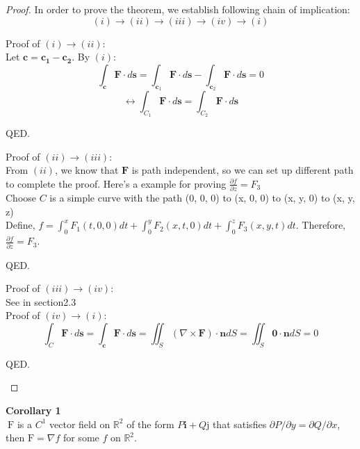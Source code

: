 \documentclass[11pt]{article}
\begin{document}
\begin{proof}
    In order to prove the theorem, we establish following chain of implication:
    \[(i) \rightarrow (ii) \rightarrow (iii) \rightarrow (iv) \rightarrow (i)\]


    Proof of $(i) \rightarrow (ii)$:\\
    Let $\mathbf{c}=\mathbf{c_1}-\mathbf{c_2}$. By $(i)$:
    \[\int_{\mathbf{c}} \mathbf{F} \cdot d \mathbf{s}=\int_{\mathbf{c}_{1}} \mathbf{F} \cdot d \mathbf{s}-\int_{\mathbf{c}_{2}} \mathbf{F} \cdot d \mathbf{s}=0\]
    \[\leftrightarrow \int_{C_{1}} \mathbf{F} \cdot d \mathbf{s}=\int_{C_{2}} \mathbf{F} \cdot d \mathbf{s}\]
    \begin{flushright}QED.\end{flushright}
    

    Proof of $(ii) \rightarrow (iii)$:\\
    From $(ii)$, we know that $\mathbf{F}$ is path independent, so we can set up different path to complete the proof. Here's a example for proving $\frac{\partial f}{\partial z} = F_3$\\
    Choose $C$ is a simple curve with the path (0, 0, 0) to (x, 0, 0) to (x, y, 0) to (x, y, z)\\
    Define, $f = \int_{0}^{x} F_{1}(t, 0,0) d t+\int_{0}^{y} F_{2}(x, t, 0) d t+\int_{0}^{z} F_{3}(x, y, t) dt$. Therefore, $\frac{\partial f}{\partial z} = F_3$. 
    \begin{flushright}QED.\end{flushright}

    Proof of $(iii) \rightarrow (iv)$:\\
    See in section2.3\\
    

    Proof of $(iv) \rightarrow (i)$:
    \[\int_{C} \mathbf{F} \cdot d \mathbf{s}=\int_{\mathbf{c}} \mathbf{F} \cdot d \mathbf{s}=\iint_{S}(\nabla \times \mathbf{F}) \cdot \mathbf{n} d S=\iint_{S}\mathbf{0} \cdot \mathbf{n} d S=0\]
    \begin{flushright}QED.\end{flushright}
\end{proof}

\newpage

\textbf{Corollary 1} \\
$\mathrm{~F}$ is a $C^{1}$ vector field on $\mathbb{R}^{2}$ of the form $P \mathbf{i}+Q \mathrm{j}$ that satisfies $\partial P / \partial y=\partial Q / \partial x$, then $\mathrm{F}=\nabla f$ for some $f$ on $\mathbb{R}^{2}$.\\
\end{document}
